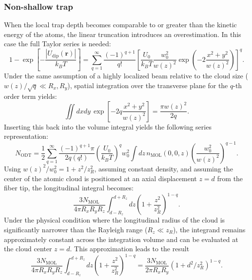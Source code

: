 \subsubsection{Non-shallow trap}
When the local trap depth becomes comparable to or greater than the kinetic energy of the atoms, the linear truncation introduces an overestimation. In this case the full Taylor series is needed:
\begin{equation}
    1 - \exp\left[ -\frac{|U_{\text{dip}}(\mathbf{r})|}{k_B T} \right] = \sum_{q=1}^{\infty} \frac{(-1)^{q+1}}{q!} \left[ \frac{U_0}{k_B T} \frac{w_0^2}{w(z)^2} \exp\left( -2\frac{x^2+y^2}{w(z)^2} \right) \right]^q.
\end{equation}
Under the same assumption of a highly localized beam relative to the cloud size ($w(z)/\sqrt{q} \ll R_x, R_y$), spatial integration over the transverse plane for the $q$-th order term yields:
\begin{equation}
    \iint dx dy \, \exp\left[ -2q\frac{x^2+y^2}{w(z)^2} \right] = \frac{\pi w(z)^2}{2q}.
\end{equation}
Inserting this back into the volume integral yields the following series representation:
\begin{equation}
    \label{eq:not_shallow_NODT}
    N_{\text{ODT}} = \frac{1}{2} \sum_{q=1}^{\infty} \frac{(-1)^{q+1}\pi}{2q(q!)} \left( \frac{U_0}{k_B T} \right)^q w_0^2 \int dz \, n_{\text{MOL}}(0,0,z) \left( \frac{w_0^2}{w(z)^2} \right)^{q-1}.
\end{equation}
Using $w(z)^2/w_0^2 = 1 + z^2/z_R^2$, assuming constant density, and assuming the center of the atomic cloud is positioned at an axial displacement $z=d$ from the fiber tip, the longitudinal integral becomes:
\begin{equation}
    \frac{3N_\text{MOL}}{4\pi R_xR_yR_z}\int_{d-R_z}^{d+R_z} dz \left( 1 + \frac{z^2}{z_R^2} \right)^{1-q}.
\end{equation}
Under the physical condition where the longitudinal radius of the cloud is significantly narrower than the Rayleigh range ($R_z \ll z_R$), the integrand remains approximately constant across the integration volume and can be evaluated at the cloud center $z=d$. This approximation leads to the result
\begin{equation}
    \label{eq:not_shallow_longitudinal_integral}
    \frac{3N_\text{MOL}}{4\pi R_xR_yR_z}\int_{d-R_z}^{d+R_z} dz \left( 1 + \frac{z^2}{z_R^2} \right)^{1-q} =  \frac{3N_{\text{MOL}}}{2\pi R_x R_y} (1 + d^2/z_R^2)^{1-q}.
\end{equation}

